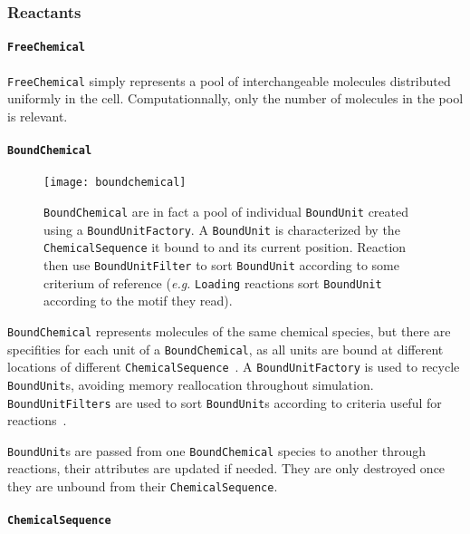 
\subsubsection{Reactants}

\paragraph{\texttt{FreeChemical}}

\texttt{FreeChemical} simply represents a pool of interchangeable molecules distributed uniformly in the cell. Computationnally, only the number of molecules in the pool is relevant.

\paragraph{\texttt{BoundChemical}}

\begin{figure}[!h]
  \centering
  \texttt{[image: boundchemical]}
  \caption{\texttt{BoundChemical} are in fact a pool of individual \texttt{BoundUnit} created using a \texttt{BoundUnitFactory}. A \texttt{BoundUnit} is characterized by the \texttt{ChemicalSequence} it bound to and its current position. Reaction then use \texttt{BoundUnitFilter} to sort \texttt{BoundUnit} according to some criterium of reference (\textit{e.g.} \texttt{Loading} reactions sort \texttt{BoundUnit} according to the motif they read).}
  \label{fig:det_bound_chemical}
\end{figure}

\texttt{BoundChemical} represents molecules of the same chemical species, but there are specifities for each unit of a \texttt{BoundChemical}, as all units are bound at different locations of different \texttt{ChemicalSequence}~. A \texttt{BoundUnitFactory} is used to recycle \texttt{BoundUnit}s, avoiding memory reallocation throughout simulation. \texttt{BoundUnitFilters} are used to sort \texttt{BoundUnit}s according to criteria useful for reactions~.


\texttt{BoundUnit}s are passed from one \texttt{BoundChemical} species to another through reactions, their attributes are updated if needed. They are only destroyed once they are unbound from their \texttt{ChemicalSequence}.

\paragraph{\texttt{ChemicalSequence}}


